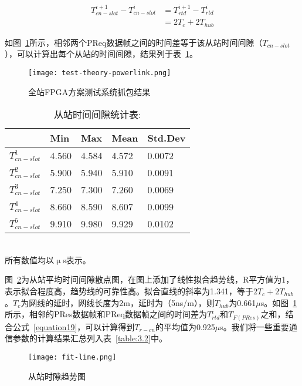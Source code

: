 \begin{equation}
\begin{split}
\label{equation21}
T_{cn-slot}^{i+1}-T_{cn-slot}^{i}&=T_{rtd}^{i+1}-T_{rtd}^{i}\\
&=2T_{c}+2T_{hub}
\end{split}
\end{equation}

如图~\ref{fig:test-theory-powerlink}所示，相邻两个PReq数据帧之间的时间差等于该从站时间间隙（$T_{cn-slot}$），可以计算出每个从站的时间间隙，结果列于表~\ref{table:3.1}。

\begin{figure}[!htb]
	\centering
	\texttt{[image: test-theory-powerlink.png]}
	\caption{全站FPGA方案测试系统抓包结果}
	\label{fig:test-theory-powerlink}
\end{figure}

\begin{table}[hbtp]
  \centering
  \caption{从站时间间隙统计表:}
  \begin{tabular}{p{70 pt}p{70 pt}p{70 pt}p{70 pt}p{70 pt}}
    \toprule
    & Min & Max & Mean & Std.Dev\\
    \midrule
    $T_{cn-slot}^{1}$ & 4.560 & 4.584 & 4.572 & 0.0072\\
    $T_{cn-slot}^{2}$ & 5.900 & 5.940 & 5.910 & 0.0091\\
    $T_{cn-slot}^{3}$ & 7.250 & 7.300 & 7.260 & 0.0069\\
    $T_{cn-slot}^{4}$ & 8.660 & 8.590 & 8.607 & 0.0099\\
    $T_{cn-slot}^{5}$ & 9.910 & 9.980 & 9.929 & 0.0102\\
    \bottomrule
  \end{tabular}
  \\
  \footnotesize{所有数值均以$\upmu$s表示。}
  \label{table:3.1}
\end{table}


图~\ref{fig:fit-line}为从站平均时间间隙散点图，在图上添加了线性拟合趋势线，R平方值为1，表示拟合程度高，趋势线的可靠性高。拟合直线的斜率为1.341，等于$2T_{c}+2T_{hub}$。$T_{c}$为网线的延时，网线长度为2m，延时为（5ns/m），则$T_{hub}$为0.661$\mu$s。如图~\ref{fig:test-theory-powerlink}所示，相邻的PRes数据帧和PReq数据帧之间的时间差为$T_{rtd}^{i}$和$T_{F(PRes)}$之和，结合公式~\ref{equation19}，可以计算得到$T_{r-cn}$的平均值为0.925$\mu$s。我们将一些重要通信参数的计算结果汇总列入表~\ref{table:3.2}中。

\begin{figure}[!htb]
  \centering
  \texttt{[image: fit-line.png]}
  \caption{从站时隙趋势图}
  \label{fig:fit-line}
\end{figure}

